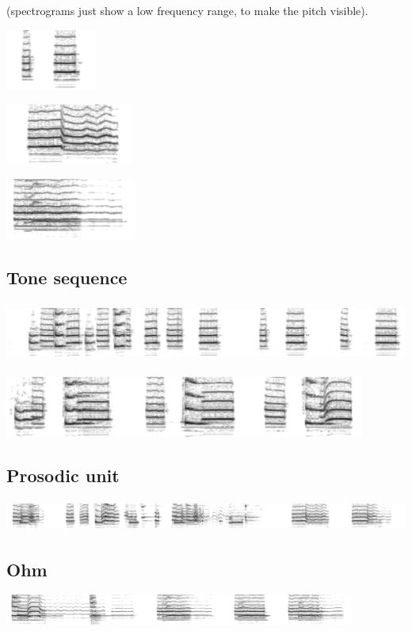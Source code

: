 (spectrograms just show a low frequency range, to make the pitch visible).

\includegraphics[height=2cm]{images/chico-output-separate-high-low}

\includegraphics[height=2cm]{images/chico-output-pair-high-low}

\includegraphics[height=2cm]{images/chico-output-ohm}

\subsection{Tone sequence}

\includegraphics[height=2cm]{images/chico-separate-begin}

\includegraphics[height=2cm]{images/chico-separate-together}

\subsection{Prosodic unit}

\includegraphics[height=1cm]{images/chico-pair}

\subsection{Ohm}

\includegraphics[height=1cm]{images/chico-ohm}




